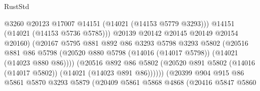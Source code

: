 \begin{lexlean}{RustStd}
\begin{coremodule}
                                          @3260
                                          @20123
                                          @17007
                                          @14151
                                          (@14021 (@14153 @5779 @3293)))
                                        @14151
                                        (@14021 (@14153 @5736 @5785)))
                                      @20139
                                      @20142
                                      @20145
                                      @20149
                                      @20154
                                      @20160)
                                    (@20167
                                      @5795
                                      @881
                                      @892
                                      @86
                                      @3293
                                      @5798
                                      @3293
                                      @5802
                                      (@20516
                                        @881
                                        @86
                                        @5798
                                        (@20520
                                          @880
                                          @5798
                                          (@14016 (@14017 @5798))
                                          (@14021 (@14023 @880 @86))))
                                      (@20516
                                        @892
                                        @86
                                        @5802
                                        (@20520
                                          @891
                                          @5802
                                          (@14016 (@14017 @5802))
                                          (@14021 (@14023 @891 @86))))))
                                  (@20399
                                    @904
                                    @915
                                    @86
                                    @5861
                                    @5870
                                    @3293
                                    @5879
                                    (@20409
                                      @5861
                                      @5868
                                      @4868
                                      (@20416
                                        @5847
                                        @5860

\end{coremodule}
\end{lexlean}
